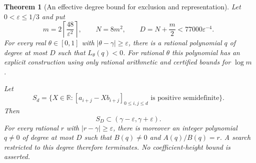 \documentclass[11pt,a4paper]{article}
\newtheorem{theorem}{Theorem}[section]
\theoremstyle{definition}
\theoremstyle{remark}
\begin{document}
\begin{theorem}[An effective degree bound for exclusion and representation]
\label{sea-square-effective-degree}
Let $0<\varepsilon\le1/3$ and put
\[
 m=2\left\lceil\frac{48}{\varepsilon^2}\right\rceil,
 \qquad N=8m^2,\qquad D=N+\frac m2<77000\varepsilon^{-4}.
\]
For every real $\theta\in[0,1]$ with
$|\theta-\gamma|\ge\varepsilon$, there is a rational polynomial
$q$ of degree at most $D$ such that $L_\theta(q)<0$.
For rational $\theta$ this polynomial has an explicit construction using
only rational arithmetic and certified bounds for $\log m$.

Let
\[
 S_d=\{X\in\mathbb R:[a_{i+j}-Xb_{i+j}]_{0\le i,j\le d}
                     \text{ is positive semidefinite}\}.
\]
Then
\begin{equation}
 S_D\subset(\gamma-\varepsilon,\gamma+\varepsilon).
 \label{sea-square-effective-interval}
\end{equation}
For every rational $r$ with $|r-\gamma|\ge\varepsilon$, there is moreover
an integer polynomial $q\ne0$ of degree at most $D$ such that
$B(q)\ne0$ and $A(q)/B(q)=r$.  A search restricted to this degree therefore
terminates.  No coefficient-height bound is asserted.
\end{theorem}
\end{document}
